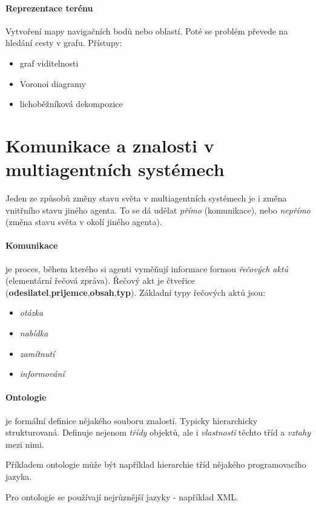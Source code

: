\documentclass[a4paper]{article}      %
\begin{document}
\paragraph{Reprezentace terénu}
Vytvoření mapy navigačních bodů nebo oblastí. Poté se problém převede na hledání cesty v grafu. 
Přístupy:
\begin{itemize}
\item graf viditelnosti
\item Voronoi diagramy
\item lichoběžníková dekompozice
\end{itemize}


\section{Komunikace a znalosti v multiagentních systémech}
Jeden ze způsobů změny stavu světa v multiagentních systémech je i změna vnitřního stavu jiného agenta.
To se dá udělat \emph{přímo} (komunikace), nebo \emph{nepřímo} (změna stavu světa v okolí jiného agenta).

\paragraph{Komunikace} je proces, během kterého si agenti vyměňují informace formou \emph{řečových aktů} (elementární řečová zpráva).
Řečový akt je čtveřice (\textbf{odesilatel},\textbf{prijemce},\textbf{obsah},\textbf{typ}). Základní typy řečových aktů jsou:
\begin{itemize}
\item \emph{otázka}
\item \emph{nabídka}
\item \emph{zamítnutí}
\item \emph{informování}
\end{itemize}

\paragraph{Ontologie} je formální definice nějakého souboru znalostí. Typicky hierarchicky strukturovaná. Definuje nejenom \emph{třídy} objektů, ale i \emph{vlastnosti} těchto tříd a \emph{vztahy} mezi nimi.

Příkladem ontologie může být například hierarchie tříd nějakého programovacího jazyka.

Pro ontologie se používají nejrůznější jazyky - například XML.
\end{document}
